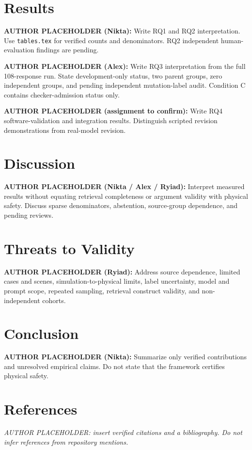 \documentclass{article}
\begin{document}
\section{Results}
\textbf{AUTHOR PLACEHOLDER (Nikta):} Write RQ1 and RQ2 interpretation. Use \texttt{tables.tex} for verified counts and denominators. RQ2 independent human-evaluation findings are pending.

\textbf{AUTHOR PLACEHOLDER (Alex):} Write RQ3 interpretation from the full 108-response run. State development-only status, two parent groups, zero independent groups, and pending independent mutation-label audit. Condition C contains checker-admission status only.

\textbf{AUTHOR PLACEHOLDER (assignment to confirm):} Write RQ4 software-validation and integration results. Distinguish scripted revision demonstrations from real-model revision.



\section{Discussion}
\textbf{AUTHOR PLACEHOLDER (Nikta / Alex / Ryiad):} Interpret measured results without equating retrieval completeness or argument validity with physical safety. Discuss sparse denominators, abstention, source-group dependence, and pending reviews.

\section{Threats to Validity}
\textbf{AUTHOR PLACEHOLDER (Ryiad):} Address source dependence, limited cases and scenes, simulation-to-physical limits, label uncertainty, model and prompt scope, repeated sampling, retrieval construct validity, and non-independent cohorts.

\section{Conclusion}
\textbf{AUTHOR PLACEHOLDER (Nikta):} Summarize only verified contributions and unresolved empirical claims. Do not state that the framework certifies physical safety.

\section*{References}
\textit{AUTHOR PLACEHOLDER: insert verified citations and a bibliography. Do not infer references from repository mentions.}
\end{document}
